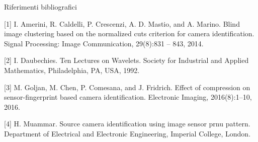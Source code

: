 \begin{tframe}{Riferimenti bibliografici}

[1] I. Amerini, R. Caldelli, P. Crescenzi, A. D. Mastio, and A. Marino. Blind image clustering based on the normalized cuts criterion for camera identification. Signal Processing: Image Communication, 29(8):831 – 843, 2014.

\vspace{0.1in}

[2] I. Daubechies. Ten Lectures on Wavelets. Society for Industrial and Applied Mathematics, Philadelphia, PA, USA, 1992.

\vspace{0.1in}

[3] M. Goljan, M. Chen, P. Comesana, and J. Fridrich. Effect of compression on sensor-fingerprint based camera identification. Electronic Imaging, 2016(8):1–10, 2016.

\vspace{0.1in}

[4] H. Muammar. Source camera identification using image sensor prnu pattern. Department of Electrical and Electronic Engineering, Imperial College, London.

\end{tframe}